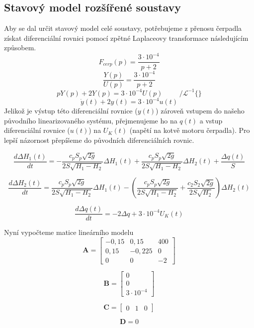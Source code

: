 \documentclass{article}
\begin{document}
		\subsection{Stavový model rozšířené soustavy}
			Aby se dal určit stavový model celé soustavy, potřebujeme z přenosu čerpadla získat diferenciální rovnici pomocí zpětné Laplaceovy transformace následujícím způsobem.
			\[F_{cerp}(p)=\frac{3\cdot10^{-4}}{p+2}\]
			\[\frac{Y(p)}{U(p)}=\frac{3\cdot10^{-4}}{p+2}\]
			\[pY(p) + 2 Y(p)=3\cdot10^{-4} U(p)\hspace{1cm} /\mathscr{L}^{-1}\{\}\]
			\[\dot{y}(t)+2 y(t)=3\cdot10^{-4} u(t)\]
			Jelikož je výstup této diferenciální rovnice (\(y(t)\)) zároveň vstupem do našeho původního linearizovaného systému, přejmenujeme ho na \(q(t)\) a vstup diferenciální rovnice (\(u(t)\)) na \(U_{K}(t)\) (napětí na kotvě motoru čerpadla). Pro lepší názornost  přepíšeme do původních diferenciálních rovnic.
			
			\[\frac{d\Delta H_1(t)}{dt}=-\frac{c_pS_p\sqrt{2g}}{2S\sqrt{H_1-H_2}}\Delta H_1(t)+\frac{c_pS_p\sqrt{2g}}{2S\sqrt{H_1-H_2}}\Delta H_2(t)+\frac{\Delta q(t)}{S}\]
			
			\[\frac{d\Delta H_2(t)}{dt}=\frac{c_pS_p\sqrt{2g}}{2S\sqrt{H_1-H_2}}\Delta H_1(t)-(\frac{c_pS_p\sqrt{2g}}{2S\sqrt{H_1-H_2}}+\frac{c_2S_2\sqrt{2g}}{2S\sqrt{H_2}})\Delta H_2(t)\]
			
			\[\frac{d\Delta q(t)}{dt}=-2\Delta q+3\cdot10^{-4}U_{K}(t)\]
			
			Nyní vypočteme matice lineárního modelu
			\[\textbf{A}=\begin{bmatrix}
				-0,15&0,15&400\\
				0,15&-0,225&0\\
				0&0&-2
			\end{bmatrix}\]
		
			\[\textbf{B}=\begin{bmatrix}
				0\\
				0\\
				3\cdot10^{-4}
			\end{bmatrix}\]
			
			\[\textbf{C}=\begin{bmatrix}
				0&1&0
			\end{bmatrix}\]
		
			\[\textbf{D}=0\]
			
\end{document}
